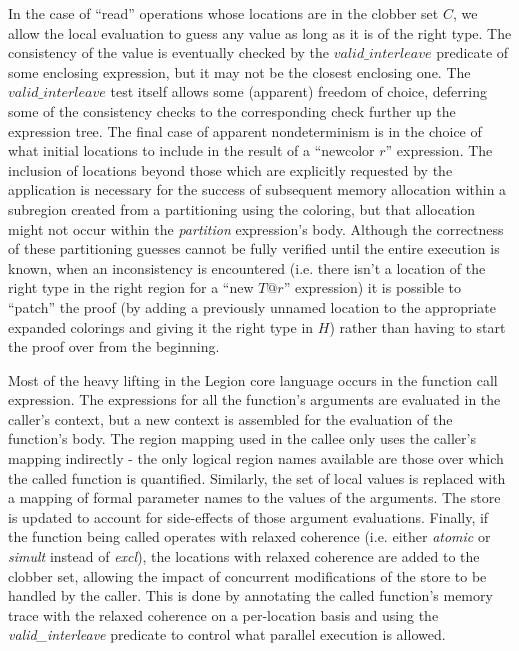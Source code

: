 In the case of ``read'' operations whose locations are in the clobber set $C$, we allow the local
evaluation to guess any value as long as it is of the right type.  The consistency of the value
is eventually checked by the $valid\_interleave$ predicate of some enclosing expression, but it
may not be the closest enclosing one.  The $valid\_interleave$ test itself allows some (apparent)
freedom of choice, deferring some of the consistency checks to the corresponding check further up
the expression tree.  The final case of apparent nondeterminism is in the choice of what initial
locations to include in the result of a ``newcolor $r$'' expression.  The inclusion of locations
beyond those which are explicitly requested by the application is necessary for the success of
subsequent memory allocation within a subregion created from a partitioning using the coloring, but
that allocation might not occur within the {\em partition} expression's
body.  Although the correctness of these partitioning guesses cannot be fully verified until the
entire execution is known, when an inconsistency is encountered (i.e. there isn't a location of
the right type in the right region for a ``new $T@r$'' expression) it is possible to ``patch'' the 
proof (by adding a previously unnamed location to the appropriate expanded colorings and giving
it the right type in $H$) rather than having to start the proof over from the beginning.

Most of the heavy lifting in the Legion core language occurs in the function call expression.
The expressions for all the function's arguments are evaluated in the caller's context, but a
new context is assembled for the evaluation of the function's body.  The region mapping used
in the callee only uses the caller's mapping indirectly - the only logical region names available
are those over which the called function is quantified.  Similarly, the set of local values is
replaced with a mapping of formal parameter names to the values of the arguments.  The store
is updated to account for side-effects of those argument evaluations.  Finally, if the function
being called operates with relaxed coherence (i.e. either {\em atomic} or {\em simult} instead of
{\em excl}), the locations with relaxed coherence are added to the clobber set, allowing the
impact of concurrent modifications of the store to be handled by the caller.  This is done by
annotating the called function's memory trace with the relaxed coherence on a per-location basis
and using the {\em valid\_interleave} predicate to control what parallel execution is allowed.

